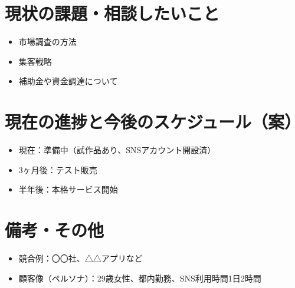 \documentclass[a4paper,12pt]{article}
\begin{document}
\section{現状の課題・相談したいこと}
\begin{itemize}[leftmargin=1.5em]
  \item 市場調査の方法
  \item 集客戦略
  \item 補助金や資金調達について %
\end{itemize}

\section{現在の進捗と今後のスケジュール（案）}
\begin{itemize}[leftmargin=1.5em]
  \item 現在：準備中（試作品あり、SNSアカウント開設済） %
  \item 3ヶ月後：テスト販売　%
  \item 半年後：本格サービス開始
\end{itemize}

\section*{備考・その他}
\begin{itemize}[leftmargin=1.5em]
  \item 競合例：〇〇社、△△アプリなど
  \item 顧客像（ペルソナ）：29歳女性、都内勤務、SNS利用時間1日2時間
\end{itemize}
\end{document}
